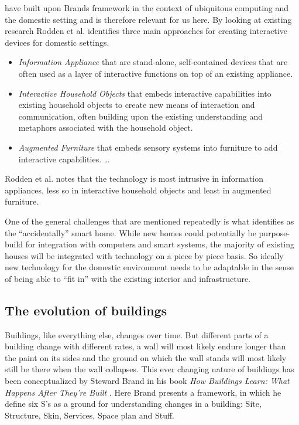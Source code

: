 
\citet{rodden2003evolution} have built upon Brands framework in the context of ubiquitous computing and the domestic setting and is therefore relevant for us here.
By looking at existing research Rodden et al. identifies three main approaches for creating interactive devices for domestic settings.

\begin{itemize}
  \item{\emph{Information Appliance} that are stand-alone, self-contained devices that are often used as a layer of interactive functions on top of an existing appliance.}
  \item{\emph{Interactive Household Objects} that embeds interactive capabilities into existing household objects to create new means of interaction and communication, often building upon the existing understanding and metaphors associated with the household object.}
  \item{\emph{Augmented Furniture} that embeds sensory systems into furniture to add interactive capabilities. \ldots}
\end{itemize}

Rodden et al. notes that the technology is most intrusive in information appliances, less so in interactive household objects and least in augmented furniture.


One of the general challenges that are mentioned repeatedly \citep{edwards2001home,aldrich2003smart,rodden2003evolution} is what \citet{edwards2001home} identifies as the ``accidentally'' smart home.
While new homes could potentially be purpose-build for integration with computers and smart systems, the majority of existing houses will be integrated with technology on a piece by piece basis.
So ideally new technology for the domestic environment needs to be adaptable in the sense of being able to ``fit in'' with the existing interior and infrastructure. 


\subsection{The evolution of buildings}
Buildings, like everything else, changes over time.
But different parts of a building change with different rates, a wall will most likely endure longer than the paint on its sides and the ground on which the wall stands will most likely still be there when the wall collapses.
This ever changing nature of buildings has been conceptualized by Steward Brand in his book \emph{How Buildings Learn: What Happens After They're Built} \citep{brand1995buildings}.
Here Brand presents a framework, in which he define six S's as a ground for understanding changes in a building: Site, Structure, Skin, Services, Space plan and Stuff.

